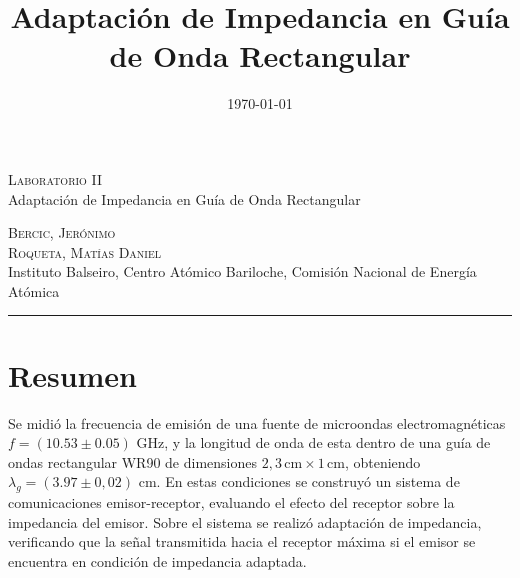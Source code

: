 \documentclass[11pt,a4paper]{article}
\date{\small{\today}}
\begin{document}
\title{Adaptación de Impedancia en Guía de Onda Rectangular}
	\LARGE{\textsc{Laboratorio II}}\\
	\Large{Adaptación de Impedancia en Guía de Onda Rectangular}\\
\begin{large}
\small\textsc{Bercic, Jerónimo}\\
\small\textsc{Roqueta, Matías Daniel}\\
\small{Instituto Balseiro, Centro Atómico Bariloche, Comisión Nacional de Energía Atómica}\\
\end{large}
\setcounter{page}{1}

\chead{}

\rfoot{\thepage} 
\renewcommand{\headrulewidth}{0.4pt} 
\renewcommand{\footrulewidth}{0.4pt} 
\pagestyle{fancy}

\hrule
\normalsize
\section{Resumen}
Se midió la frecuencia de emisión de una fuente de microondas electromagnéticas $f=(10.53\pm0.05)$ GHz, y la longitud de onda de esta dentro de una guía de ondas rectangular WR90 de dimensiones $2,3\, \mathrm{cm} \times 1\, \mathrm{cm}$, obteniendo $\lambda_g=(3.97\pm0,02)$ cm. 
En estas condiciones se construyó un sistema de comunicaciones emisor-receptor, evaluando el efecto del receptor sobre la impedancia del emisor.
Sobre el sistema se realizó adaptación de impedancia, verificando que la señal transmitida hacia el receptor máxima si el emisor se encuentra en condición de impedancia adaptada. 
\end{document}
